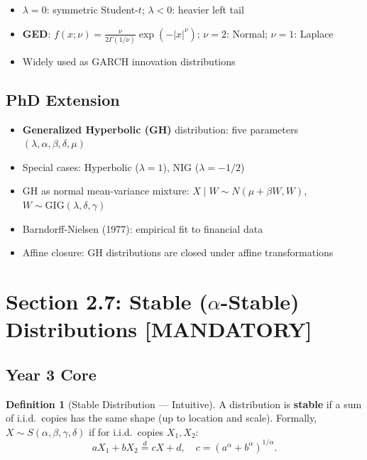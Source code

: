 \documentclass[11pt, a4paper]{article}
\theoremstyle{definition}
\newtheorem{defn}{Definition}
\begin{document}
\begin{itemize}
  \item $\lambda = 0$: symmetric Student-$t$; \quad $\lambda < 0$: heavier left tail
  \item \textbf{GED}: $f(x;\nu) = \frac{\nu}{2\Gamma(1/\nu)}\exp(-|x|^\nu)$; \quad $\nu = 2$: Normal; $\nu = 1$: Laplace
  \item Widely used as GARCH innovation distributions
\end{itemize}

\subsection{PhD Extension}
\begin{itemize}
  \item \textbf{Generalized Hyperbolic (GH)} distribution: five parameters $(\lambda, \alpha, \beta, \delta, \mu)$
  \item Special cases: Hyperbolic ($\lambda=1$), NIG ($\lambda=-1/2$)
  \item GH as normal mean-variance mixture: $X \mid W \sim N(\mu + \beta W, W)$, $W \sim \text{GIG}(\lambda, \delta, \gamma)$
  \item Barndorff-Nielsen (1977): empirical fit to financial data
  \item Affine closure: GH distributions are closed under affine transformations
\end{itemize}

\section{Section 2.7: Stable ($\alpha$-Stable) Distributions \textbf{[MANDATORY]}}

\subsection{Year 3 Core}

\begin{defn}[Stable Distribution — Intuitive]
A distribution is \textbf{stable} if a sum of i.i.d.\ copies has the same shape (up to location and scale). Formally, $X \sim S(\alpha, \beta, \gamma, \delta)$ if for i.i.d.\ copies $X_1, X_2$:
\[
  aX_1 + bX_2 \stackrel{d}{=} cX + d, \quad c = (a^\alpha + b^\alpha)^{1/\alpha}.
\]
\end{defn}
\end{document}
